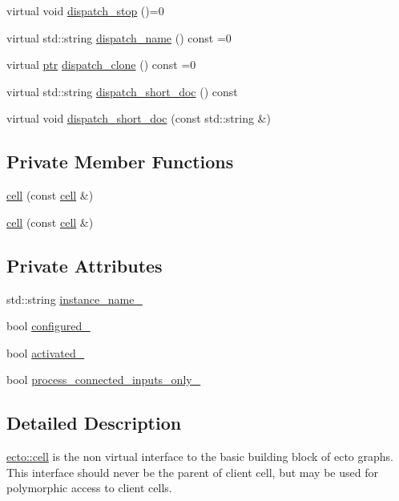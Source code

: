 \begin{DoxyCompactItemize}
\item 
virtual void \hyperlink{structecto_1_1cell_a65ff7141e927a7115a785478a03b94bc}{dispatch\-\_\-stop} ()=0
\item 
virtual std\-::string \hyperlink{structecto_1_1cell_a456b56e3291f5e2bb68ce31a4a43ece5}{dispatch\-\_\-name} () const =0
\item 
virtual \hyperlink{structecto_1_1cell_af2cab9d2bc012088c4f58c40da57a862}{ptr} \hyperlink{structecto_1_1cell_a7beccd749c33bd8b4c5827598e8fe5a5}{dispatch\-\_\-clone} () const =0
\item 
virtual std\-::string \hyperlink{structecto_1_1cell_a400b8aecf15588cfb21d712fbb000e8a}{dispatch\-\_\-short\-\_\-doc} () const 
\item 
virtual void \hyperlink{structecto_1_1cell_a407d24db843ffe12ac57c9a8827a9fe8}{dispatch\-\_\-short\-\_\-doc} (const std\-::string \&)
\end{DoxyCompactItemize}
\subsection*{Private Member Functions}
\begin{DoxyCompactItemize}
\item 
\hyperlink{structecto_1_1cell_ac0ae6a72cecf48916bb6dd1b6393d1b3}{cell} (const \hyperlink{structecto_1_1cell}{cell} \&)
\item 
\hyperlink{structecto_1_1cell_ac0ae6a72cecf48916bb6dd1b6393d1b3}{cell} (const \hyperlink{structecto_1_1cell}{cell} \&)
\end{DoxyCompactItemize}
\subsection*{Private Attributes}
\begin{DoxyCompactItemize}
\item 
std\-::string \hyperlink{structecto_1_1cell_a2bf4e65c7a699624c61d3b55cfac45ed}{instance\-\_\-name\-\_\-}
\item 
bool \hyperlink{structecto_1_1cell_a187d36610ae8035e9f589de06ecc0d0a}{configured\-\_\-}
\item 
bool \hyperlink{structecto_1_1cell_ad270620c006f30471b2371feb38b6a03}{activated\-\_\-}
\item 
bool \hyperlink{structecto_1_1cell_a9a9d7fa3bb72fd74073a997bfb6cbad8}{process\-\_\-connected\-\_\-inputs\-\_\-only\-\_\-}
\end{DoxyCompactItemize}


\subsection{Detailed Description}
\hyperlink{structecto_1_1cell}{ecto\-::cell} is the non virtual interface to the basic building block of ecto graphs. This interface should never be the parent of client cell, but may be used for polymorphic access to client cells. 

